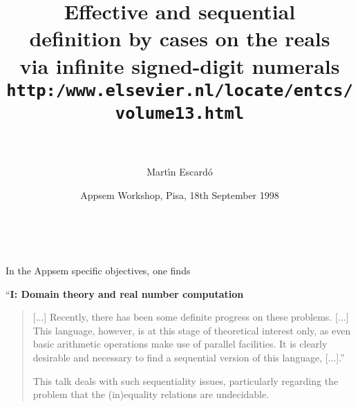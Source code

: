 \documentclass{csslides-1.1}
\newcommand{\myemph}[1]{{\it #1}\/}
\begin{document}
\title[http://www.dcs.ed.ac.uk/home/mhe]{Effective and sequential \\
definition by cases on the reals \\
via infinite signed-digit numerals \\[1ex]
{\small\tt http:/www.elsevier.nl/locate/entcs/volume13.html}\\[5ex]~}
\author{Mart\' \i n Escard\'o}
\date[LFCS]{Appsem Workshop, Pisa, 18th September 1998}
\maketitle

\begin{slide}{}

~

\vfill

In the Appsem specific objectives, one finds

\vfill

``{\bf I: Domain theory and real number computation}

\begin{quote}
[...] Recently, there has been some definite progress on these
problems. [...] This language, however, is at this stage of
theoretical interest only, as even basic arithmetic operations make use
of parallel facilities. It is clearly desirable and necessary to find
a sequential version of this language, [...].''

\vfill

This talk deals with such sequentiality issues, particularly regarding
the problem that the (in)equality relations are undecidable.

\vfill

\end{quote}

\end{slide}


  

  



  
\end{document}
